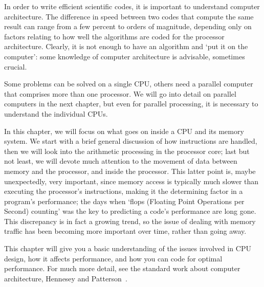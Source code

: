 
In order to write efficient scientific codes, it is important to
understand computer architecture. The difference in speed between two
codes that compute the same result can range from a few percent to
orders of magnitude, depending only on factors relating to how well
the algorithms are coded for the processor architecture. Clearly, it
is not enough to have an algorithm and `put it on the computer': some
knowledge of computer architecture is advisable, sometimes crucial.

Some
problems can be solved on a single \ac{CPU}, others need a parallel
computer that comprises more than one processor. We will go into
detail on parallel computers in the next chapter, but even for
parallel processing, it is necessary to understand the individual \acp{CPU}.

In this chapter, we will focus on what goes on inside a \ac{CPU} and its
memory system. We start with a brief general discussion of how
instructions are handled, then we will look into the arithmetic
processing in the processor core; last but not least, we will devote
much attention to the movement of data between memory and the
processor, and inside the processor. This latter point is, maybe
unexpectedly, very important, since memory access is typically much
slower than executing the processor's instructions, making it the
determining factor in a program's performance; the days when
`flops (Floating Point Operations per Second) counting' was the key to
predicting a code's performance are long gone. This discrepancy is in
fact a growing trend, so the issue of dealing with memory traffic has
been becoming more important over time, rather than going away.

This chapter will give you a basic understanding of the issues
involved in \ac{CPU} design, how it affects performance, and how you can
code for optimal performance. For much more detail, see 
the standard work about computer architecture, Hennesey and
Patterson~\cite{HennessyPatterson}. 

